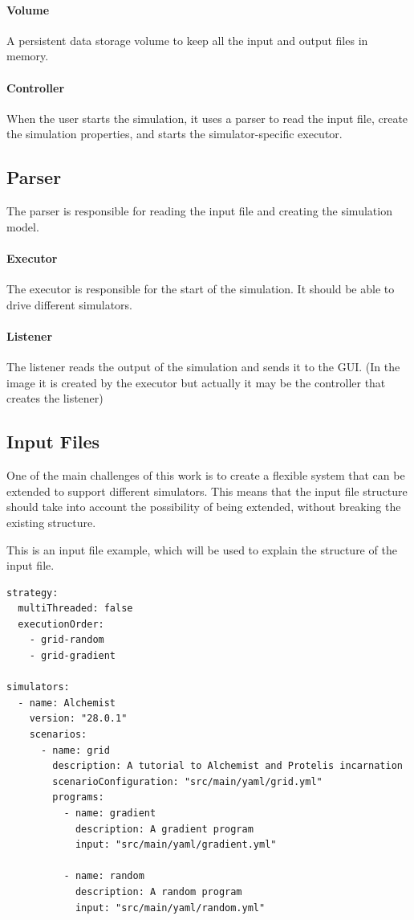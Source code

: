 \documentclass[12pt,a4paper,openright,twoside]{book}
\begin{document}
\paragraph*{Volume} A persistent data storage volume to keep all the input and output files in memory. 

\paragraph*{Controller} When the user starts the simulation, it uses a parser to read the input file, create the simulation properties,
and starts the simulator-specific executor.

\subsection{Parser} 
The parser is responsible for reading the input file and creating the simulation model.

\paragraph*{Executor} The executor is responsible for the start of the simulation. It should be able to drive different simulators.

\paragraph*{Listener} The listener reads the output of the simulation and sends it to the GUI.
(In the image it is created by the executor but actually it may be the controller that creates the listener)

\subsection{Input Files}

One of the main challenges of this work is to create a flexible system that can be extended to support different simulators.
This means that the input file structure should take into account the possibility of being extended, without breaking the existing structure.

This is an input file example, which will be used to explain the structure of the input file.

\begin{lstlisting}[style=yaml]
strategy:
  multiThreaded: false
  executionOrder:
    - grid-random
    - grid-gradient

simulators:
  - name: Alchemist
    version: "28.0.1"
    scenarios:
      - name: grid
        description: A tutorial to Alchemist and Protelis incarnation
        scenarioConfiguration: "src/main/yaml/grid.yml"
        programs:
          - name: gradient
            description: A gradient program
            input: "src/main/yaml/gradient.yml"

          - name: random
            description: A random program
            input: "src/main/yaml/random.yml"
\end{lstlisting}
\end{document}
